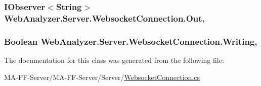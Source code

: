 \subsubsection[{Out}]{\setlength{\rightskip}{0pt plus 5cm}I\+Observer$<$String$>$ Web\+Analyzer.\+Server.\+Websocket\+Connection.\+Out\hspace{0.3cm}{\ttfamily [get]}, {\ttfamily [set]}}\label{class_web_analyzer_1_1_server_1_1_websocket_connection_a1f0be7b1ff80c5b742204d0883157578}
\hypertarget{class_web_analyzer_1_1_server_1_1_websocket_connection_a973edb4f0e5e1644f551bf132ae77183}{}
\subsubsection[{Writing}]{\setlength{\rightskip}{0pt plus 5cm}Boolean Web\+Analyzer.\+Server.\+Websocket\+Connection.\+Writing\hspace{0.3cm}{\ttfamily [get]}, {\ttfamily [set]}}\label{class_web_analyzer_1_1_server_1_1_websocket_connection_a973edb4f0e5e1644f551bf132ae77183}


The documentation for this class was generated from the following file\+:\begin{DoxyCompactItemize}
\item 
M\+A-\/\+F\+F-\/\+Server/\+M\+A-\/\+F\+F-\/\+Server/\+Server/\hyperlink{_websocket_connection_8cs}{Websocket\+Connection.\+cs}\end{DoxyCompactItemize}
